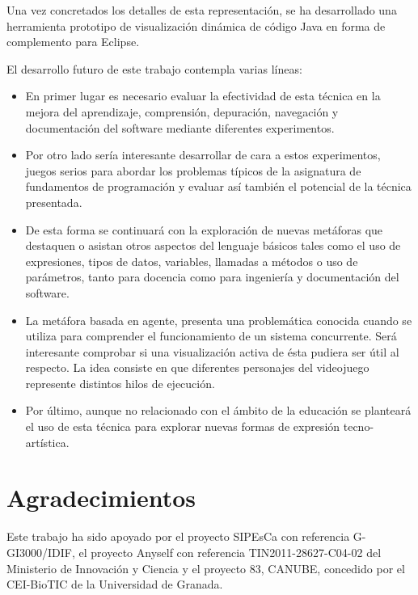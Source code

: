 \documentclass{llncs}
\begin{document}
Una vez concretados los detalles de esta representación, se ha desarrollado una herramienta prototipo de visualización dinámica de código Java en forma de complemento para Eclipse. 

El desarrollo futuro de este trabajo contempla varias líneas:
\begin{itemize}
\item En primer lugar es necesario evaluar la efectividad de esta técnica en la mejora del aprendizaje, comprensión, depuración, navegación y documentación del software mediante diferentes experimentos.
\item Por otro lado sería interesante desarrollar de cara a estos experimentos, juegos serios para abordar los problemas típicos de la asignatura de fundamentos de programación y evaluar así también el potencial de la técnica presentada.
\item De esta forma se continuará con la exploración de nuevas metáforas que destaquen o asistan otros aspectos del lenguaje básicos tales como el uso de expresiones, tipos de datos, variables, llamadas a métodos o uso de parámetros, tanto para docencia como para ingeniería y documentación del software.

\item La metáfora basada en agente, presenta una problemática conocida cuando se utiliza para comprender el funcionamiento de un sistema concurrente. Será interesante comprobar si una visualización activa de ésta pudiera ser útil al respecto. La idea consiste en que diferentes personajes del videojuego represente distintos hilos de ejecución.
 



\item Por último, aunque no relacionado con el ámbito de la educación se planteará el uso de esta técnica para explorar nuevas formas de expresión tecno-artística.
\end{itemize}





\section*{Agradecimientos}
Este trabajo ha sido apoyado por el proyecto SIPEsCa con
referencia G-GI3000/IDIF, el proyecto Anyself
con referencia TIN2011-28627-C04-02 del Ministerio de Innovación y
Ciencia y el proyecto 83, CANUBE, concedido por el CEI-BioTIC de la
Universidad de Granada. 





\end{document}
